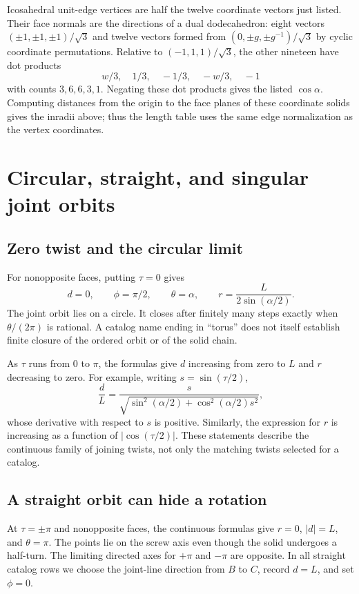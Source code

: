 \documentclass[11pt]{article}
\theoremstyle{definition}
\begin{document}
Icosahedral unit-edge vertices are half the twelve coordinate vectors just
listed. Their face normals are the directions of a dual dodecahedron:
eight vectors $(\pm1,\pm1,\pm1)/\sqrt3$ and twelve vectors formed from
$(0,\pm g,\pm g^{-1})/\sqrt3$ by cyclic coordinate permutations. Relative
to $(-1,1,1)/\sqrt3$, the other nineteen have dot products
\[
 w/3,\quad 1/3,\quad -1/3,\quad -w/3,\quad -1
\]
with counts $3,6,6,3,1$. Negating these dot products gives the listed
$\cos\alpha$. Computing distances from the origin to the face planes of
these coordinate solids gives the inradii above; thus the length table uses
the same edge normalization as the vertex coordinates.

\section{Circular, straight, and singular joint orbits}\label{sec:degenerate}
\subsection{Zero twist and the circular limit}
For nonopposite faces, putting $\tau=0$ gives
\begin{equation}\label{eq:torus}
 d=0,\qquad \phi=\pi/2,\qquad \theta=\alpha,
 \qquad r=\frac{L}{2\sin(\alpha/2)}.
\end{equation}
The joint orbit lies on a circle. It closes after finitely many steps exactly
when $\theta/(2\pi)$ is rational. A catalog name ending in ``torus'' does
not itself establish finite closure of the ordered orbit or of the solid chain.

As $\tau$ runs from $0$ to $\pi$, the formulas give $d$ increasing from zero
to $L$ and $r$ decreasing to zero. For example, writing $s=\sin(\tau/2)$,
\[
 \frac dL=\frac{s}{\sqrt{\sin^2(\alpha/2)+\cos^2(\alpha/2)s^2}},
\]
whose derivative with respect to $s$ is positive. Similarly, the expression
for $r$ is increasing as a function of $|\cos(\tau/2)|$. These statements
describe the continuous family of joining twists, not only the matching
twists selected for a catalog.

\subsection{A straight orbit can hide a rotation}
At $\tau=\pm\pi$ and nonopposite faces, the continuous formulas give
$r=0$, $|d|=L$, and $\theta=\pi$. The points lie on the screw axis even
though the solid undergoes a half-turn. The limiting directed axes for
$+\pi$ and $-\pi$ are opposite. In all straight catalog rows we choose
the joint-line direction from $B$ to $C$, record $d=L$, and set $\phi=0$.
\end{document}
